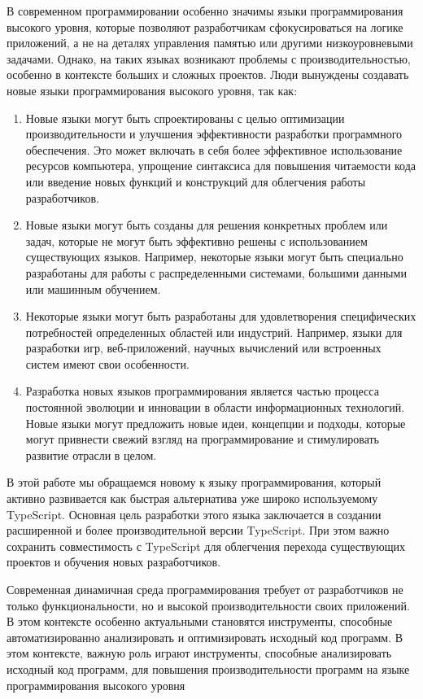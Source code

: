 \documentclass{mipt-thesis-bs}
\begin{document}
В современном программировании особенно значимы языки программирования высокого уровня, которые
позволяют разработчикам сфокусироваться на логике приложений, а не на деталях управления
памятью или другими низкоуровневыми задачами. Однако, на таких языках возникают проблемы
с производительностью, особенно в контексте больших и сложных проектов. Люди вынуждены
создавать новые языки программирования высокого уровня, так как:
\begin{enumerate}
    \item Новые языки могут быть спроектированы с целью оптимизации производительности
    и улучшения эффективности разработки программного обеспечения. Это может
    включать в себя более эффективное использование ресурсов компьютера, упрощение
    синтаксиса для повышения читаемости кода или введение новых функций и
    конструкций для облегчения работы разработчиков.
    \item  Новые языки могут быть созданы для решения конкретных проблем или
    задач, которые не могут быть эффективно решены с использованием существующих
    языков. Например, некоторые языки могут быть специально разработаны для работы
    с распределенными системами, большими данными или машинным обучением.
    \item Некоторые языки могут быть разработаны для удовлетворения специфических
    потребностей определенных областей или индустрий. Например, языки для
    разработки игр, веб-приложений, научных вычислений или встроенных систем
    имеют свои особенности.
    \item Разработка новых языков программирования является частью процесса
    постоянной эволюции и инновации в области информационных технологий.
    Новые языки могут предложить новые идеи, концепции и подходы, которые
    могут привнести свежий взгляд на программирование и стимулировать развитие отрасли в целом.
\end{enumerate}

В этой работе мы обращаемся новому к языку программирования, который активно развивается
как быстрая альтернатива уже широко используемому TypeScript. Основная цель разработки
этого языка заключается в создании расширенной и более производительной версии TypeScript.
При этом важно сохранить совместимость с TypeScript для облегчения перехода существующих
проектов и обучения новых разработчиков.

Современная динамичная среда программирования требует от разработчиков не
только функциональности, но и высокой производительности своих приложений.
В этом контексте особенно актуальными становятся инструменты, способные
автоматизированно анализировать и оптимизировать исходный код программ.
В этом контексте, важную роль играют инструменты, способные анализировать исходный код программ,
для повышения производительности программ на языке программирования высокого уровня
\end{document}
